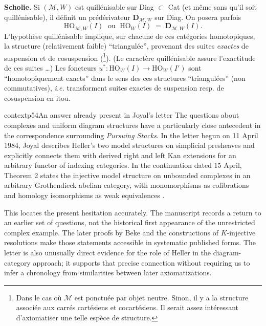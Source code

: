 \textbf{Scholie.} Si $(\mathcal{M},W)$ est quillénisable sur Diag $\subset$ Cat (et même sans qu'il soit quillénisable), il définit un prédérivateur $\mathbf{D}_{\mathcal{M},W}$ sur Diag. On posera parfois
\[ \mathrm{HO}_{\mathcal{M},W}(I) \;\text{ ou }\; \mathrm{HO}_{W}(I) \;=\; \mathbf{D}_{\mathcal{M},W}(I). \]
L'hypothèse quillénisable implique, sur chacune de ces catégories homotopiques, la structure (relativement faible) ``triangulée'', provenant des suites \textit{exactes} de suspension et de cosuspension (\footnote[32]{Dans le cas où $\mathcal{M}$ est ponctuée par objet neutre. Sinon, il y a la structure associée aux carrés cartésiens et cocartésiens. Il serait assez intéressant d'axiomatiser une telle espèce de structure.}). (Le caractère quillénisable assure l'exactitude de ces suites \dots) Les foncteurs $u^{*} : \mathrm{HO}_{W}(I) \longrightarrow \mathrm{HO}_{W}(I')$
sont ``homotopiquement exacts'' dans le sens des ces structures ``triangulées'' (non commutatives), \textit{i.e.} transforment suites exactes de suspension resp. de cosuspension en itou. %

\begin{dcomment}{context}{p54}{An answer already present in Joyal's letter}
The questions about complexes and uniform diagram structures have a particularly close antecedent in the correspondence surrounding \emph{Pursuing Stacks}. In the letter begun on 11 April 1984, Joyal describes Heller's two model structures on simplicial presheaves and explicitly connects them with derived right and left Kan extensions for an arbitrary functor of indexing categories. In the continuation dated 15 April, Theorem 2 states the injective model structure on unbounded complexes in an arbitrary Grothendieck abelian category, with monomorphisms as cofibrations and homology isomorphisms as weak equivalences \citep[pp.~3 and 10]{Joyal1984Letter}.

This locates the present hesitation accurately. The manuscript records a return to an earlier set of questions, not the historical first appearance of the unrestricted complex example. The later proofs by Beke and the constructions of $K$-injective resolutions make those statements accessible in systematic published forms. The letter is also unusually direct evidence for the role of Heller in the diagram-category approach; it supports that precise connection without requiring us to infer a chronology from similarities between later axiomatizations.
\end{dcomment}



